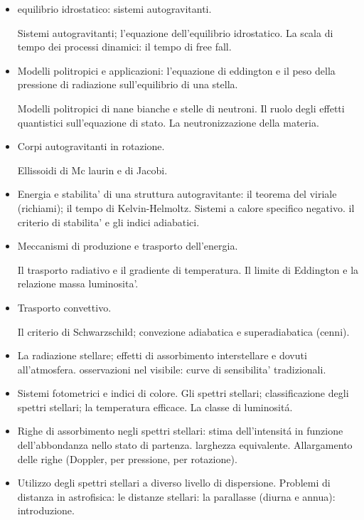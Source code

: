 \begin{itemize}
    \item equilibrio idrostatico: sistemi autogravitanti.
    
Sistemi autogravitanti; l'equazione dell'equilibrio idrostatico. La scala di tempo dei processi dinamici: il tempo di free fall.

\item Modelli politropici e applicazioni: l'equazione di eddington e il peso della pressione di radiazione sull'equilibrio di una stella. 

Modelli politropici di nane bianche e stelle di neutroni. Il ruolo degli effetti quantistici sull'equazione di stato. La neutronizzazione della materia.

\item Corpi autogravitanti in rotazione.

Ellissoidi di Mc laurin e di Jacobi. 

\item Energia e stabilita' di una struttura autogravitante: il teorema del viriale (richiami); il tempo di Kelvin-Helmoltz. Sistemi a calore specifico negativo.
il criterio di stabilita' e gli indici adiabatici.

\item Meccanismi di produzione e trasporto dell'energia.

Il trasporto radiativo e il gradiente di temperatura. Il limite di Eddington e la relazione massa luminosita'. 

\item Trasporto convettivo.

Il criterio di Schwarzschild; convezione adiabatica e superadiabatica (cenni).

\item La radiazione stellare; effetti di assorbimento interstellare e dovuti all'atmosfera. osservazioni nel visibile: curve di sensibilita' tradizionali. 

\item Sistemi fotometrici e indici di colore. Gli spettri stellari; classificazione degli spettri stellari; la temperatura efficace. La classe di luminosit\'a.

\item Righe di assorbimento negli spettri stellari: stima dell'intensit\'a in funzione dell'abbondanza nello stato di partenza. larghezza equivalente. Allargamento delle righe (Doppler, per pressione, per rotazione).

\item Utilizzo degli spettri stellari a diverso livello di dispersione. Problemi di distanza in astrofisica: le distanze stellari: la parallasse (diurna e annua): introduzione.


\end{itemize}
